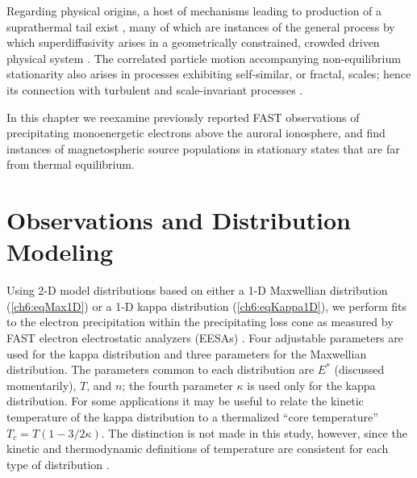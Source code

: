   Regarding physical origins, a host of mechanisms leading to production of a
  suprathermal tail exist \citep[e.g., review by][]{Pierrard2010}, many of which
  are instances of the general process by which superdiffusivity arises in a
  geometrically constrained, crowded driven physical system
  \citep{Benichou2013}.  The correlated particle motion accompanying
  non-equilibrium stationarity also arises in processes exhibiting self-similar,
  or fractal, scales; hence its connection with turbulent and scale-invariant
  processes \citep{West1990,Treumann1999a,Leubner2004}.

  In this chapter we reexamine previously reported FAST observations of
  precipitating monoenergetic electrons above the auroral ionosphere, and find
  instances of magnetospheric source populations in stationary states that are
  far from thermal equilibrium.

  \section{Observations and Distribution Modeling}

  Using 2-D model distributions based on either a 1-D Maxwellian distribution
  (\ref{ch6:eqMax1D}) or a 1-D kappa distribution (\ref{ch6:eqKappa1D}), we
  perform fits to the electron precipitation within the precipitating loss cone
  as measured by FAST electron electrostatic analyzers (EESAs) \citep{Carlson2001}. Four
  adjustable parameters are used for the kappa distribution and three parameters
  for the Maxwellian distribution. The parameters common to each distribution
  are $E^*$ (discussed momentarily), $T$, and $n$; the fourth parameter $\kappa$
  is used only for the kappa distribution. For some applications
  \citep[e.g.,][]{Sutherland2012} it may be useful to relate the kinetic
  temperature of the kappa distribution to a thermalized ``core temperature''
  $T_c = T (1-3/2 \kappa)$. The distinction is not made in this study, however,
  since the kinetic and thermodynamic definitions of temperature are consistent
  for each type of distribution \citep{Livadiotis2010}.

